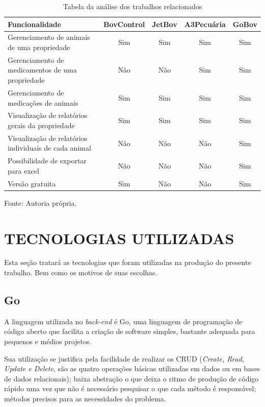 \begin{table}[H]
	\begin{center}
		\caption{Tabela da análise dos trabalhos relacionados}
		\begin{tabular}{ | p{8cm} |  c | c | c | c |}
			\hline
			Funcionalidade & BovControl & JetBov & A3Pecuária & GoBov \\ \hline
			Gerenciamento de animais de uma propriedade & Sim & Sim & Sim & Sim \\  \hline
			Gerenciamento de medicamentos de uma propriedade & Não & Não & Sim & Sim  \\ \hline
			Gerenciamento de medicações de animais & Sim & Sim & Sim & Sim  \\ \hline
			Visualização de relatórios gerais da propriedade & Sim & Sim & Sim & Sim  \\ \hline
			Visualização de relatórios individuais de cada animal & Não & Não & Não & Sim  \\ \hline
			Possibilidade de exportar para excel & Não & Não & Não & Sim  \\ \hline
			Versão gratuita & Sim & Não & Não & Sim  \\
			\hline
		\end{tabular}
		Fonte: Autoria própria.
	\end{center}
\end{table}


\section{TECNOLOGIAS UTILIZADAS}

Esta seção tratará as tecnologias que foram utilizadas na produção do presente trabalho. Bem como os motivos de suas escolhas.

\subsection{\textbf{Go}}

A linguagem utilizada no \textit{back-end} é Go, uma linguagem de programação de código aberto que facilita a criação de software simples, bastante adequada para pequenos e médios projetos.

Sua utilização se justifica pela facilidade de realizar os CRUD (\textit{Create, Read, Update e Delete}, são as quatro operações básicas utilizadas em dados ou em bases de dados relacionais); baixa abstração o que deixa o ritmo de produção de código rápido uma vez que não é necessário pesquisar o que cada método é responsável; métodos precisos para as necessidades do problema.

